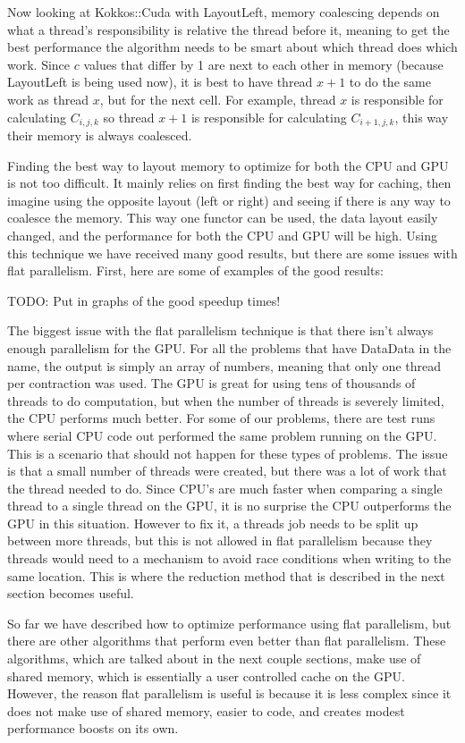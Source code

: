 Now looking at Kokkos::Cuda with LayoutLeft, memory coalescing depends on what a thread's responsibility is relative the thread before it, meaning to get the best performance the algorithm needs to be smart about which thread does which work. Since $c$ values that differ by 1 are next to each other in memory (because LayoutLeft is being used now), it is best to have thread $x+1$ to do the same work as thread $x$, but for the next cell. For example, thread $x$ is responsible for calculating $C_{i, j, k}$ so thread $x+1$ is responsible for calculating $C_{i+1, j, k}$, this way their memory is always coalesced. 

Finding the best way to layout memory to optimize for both the CPU and GPU is not too difficult. It mainly relies on first finding the best way for caching, then imagine using the opposite layout (left or right) and seeing if there is any way to coalesce the memory. This way one functor can be used, the data layout easily changed, and the performance for both the CPU and GPU will be high. Using this technique we have received many good results, but there are some issues with flat parallelism. First, here are some of examples of the good results:

TODO: Put in graphs of the good speedup times!

The biggest issue with the flat parallelism technique is that there isn't always enough parallelism for the GPU. For all the problems that have DataData in the name, the output is simply an array of numbers, meaning that only one thread per contraction was used. The GPU is great for using tens of thousands of threads to do computation, but when the number of threads is severely limited, the CPU performs much better. For some of our problems, there are test runs where serial CPU code out performed the same problem running on the GPU. This is a scenario that should not happen for these types of problems. The issue is that a small number of threads were created, but there was a lot of work that the thread needed to do. Since CPU's are much faster when comparing a single thread to a single thread on the GPU, it is no surprise the CPU outperforms the GPU in this situation. However to fix it, a threads job needs to be split up between more threads, but this is not allowed in flat parallelism because they threads would need to a mechanism to avoid race conditions when writing to the same location. This is where the reduction method that is described in the next section becomes useful.

So far we have described how to optimize performance using flat parallelism, but there are other algorithms that perform even better than flat parallelism. These algorithms, which are talked about in the next couple sections, make use of shared memory, which is essentially a user controlled cache on the GPU. However, the reason flat parallelism is useful is because it is less complex since it does not make use of shared memory, easier to code, and creates modest performance boosts on its own. 

